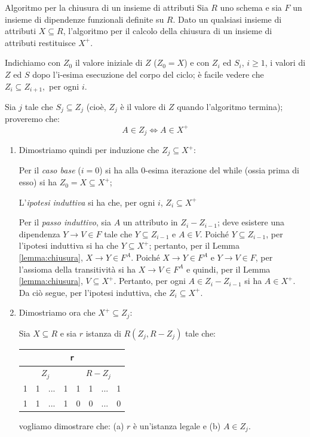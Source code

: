\begin{Thm}{Algoritmo per la chiusura di un insieme di attributi}{}
    Sia $R$ uno schema e sia $F$ un insieme di dipendenze funzionali definite su $R$. Dato un qualsiasi insieme di attributi $X \subseteq R$, l'algoritmo per il calcolo della chiusura di un insieme di attributi restituisce $X^+$.

    \begin{demonstration}
        Indichiamo con $Z_0$ il valore iniziale di $Z$ ($Z_0=X$) e con $Z_i$ ed $S_i$, $i\geq1$, i valori di $Z$ ed $S$ dopo l'i-esima esecuzione del corpo del ciclo; è facile vedere che $Z_i\subseteq Z_{i+1},$ per ogni $i$.
        
        Sia $j$ tale che $S_j\subseteq Z_j$ (cioè, $Z_j$ è il valore di $Z$ quando l'algoritmo termina); proveremo che:
        \begin{equation*}
            A\in Z_j \iff A\in X^+
        \end{equation*}
        \begin{enumerate}
            \item Dimostriamo quindi per induzione che $Z_j \subseteq X^+$:

        Per il \textit{caso base} ($i = 0$) si ha alla 0-esima iterazione del while (ossia prima di esso) si ha $Z_0 = X \subseteq X^+$;

        L'\textit{ipotesi induttiva} si ha che, per ogni $i$, $Z_i \subseteq X^+$

        Per il \textit{passo induttivo}, sia $A$ un attributo in $Z_i-Z_{i-1}$; deve esistere una dipendenza $Y\to V\in F$ tale che $Y\subseteq Z_{i-1}$ e $A\in V$. Poiché $Y\subseteq Z_{i-1}$, per l'ipotesi induttiva si ha che $Y\subseteq X^+$; pertanto, per il Lemma \ref{lemma:chiusura}, $X\to Y\in F^A$. Poiché $X\to Y\in F^A$ e $Y\to V\in F$, per l'assioma della transitività si ha $X\to V\in F^A$ e quindi, per il Lemma \ref{lemma:chiusura}, $V\subseteq X^+$. Pertanto, per ogni $A\in Z_i-Z_{i-1}$ si ha $A\in X^+$. Da ciò segue, per l'ipotesi induttiva, che $Z_i\subseteq X^+$.

        \item Dimostriamo ora che $X^+ \subseteq Z_j$:

         Sia $X \subseteq R$ e sia $r$ istanza di $R(Z_j , R-Z_j)$ tale che:
          \begin{center}
            \begin{tabular}{|c|c|c|c|c|c|c|c|}
                \hline\multicolumn{8}{|c|}{\Verb|r|}\\
                \hline\multicolumn{4}{|c|}{$Z_j$} & \multicolumn{4}{|c|}{$R-Z_j$}\\\hline
                1 & 1 & ... & 1 & 1 & 1 & ... & 1\\
                1 & 1 & ... & 1 & 0 & 0 & ... & 0\\\hline
            \end{tabular}
        \end{center}
        vogliamo dimostrare che: (a) $r$ è un'istanza legale e (b) $A\in Z_j$.
        

\end{enumerate}
\end{demonstration}
\end{Thm}
